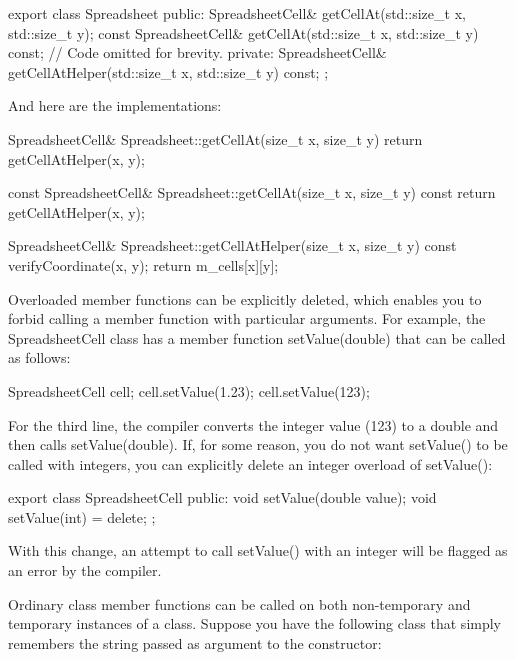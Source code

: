 \begin{cpp}
export class Spreadsheet
{
    public:
        SpreadsheetCell& getCellAt(std::size_t x, std::size_t y);
        const SpreadsheetCell& getCellAt(std::size_t x, std::size_t y) const;
        // Code omitted for brevity.
    private:
        SpreadsheetCell& getCellAtHelper(std::size_t x, std::size_t y) const;
};
\end{cpp}

And here are the implementations:

\begin{cpp}
SpreadsheetCell& Spreadsheet::getCellAt(size_t x, size_t y)
{
    return getCellAtHelper(x, y);
}

const SpreadsheetCell& Spreadsheet::getCellAt(size_t x, size_t y) const
{
    return getCellAtHelper(x, y);
}

SpreadsheetCell& Spreadsheet::getCellAtHelper(size_t x, size_t y) const
{
    verifyCoordinate(x, y);
    return m_cells[x][y];
}
\end{cpp}


Overloaded member functions can be explicitly deleted, which enables you to forbid calling a member function with particular arguments. For example, the SpreadsheetCell class has a member function setValue(double) that can be called as follows:

\begin{cpp}
SpreadsheetCell cell;
cell.setValue(1.23);
cell.setValue(123);
\end{cpp}

For the third line, the compiler converts the integer value (123) to a double and then calls setValue(double). If, for some reason, you do not want setValue() to be called with integers, you can explicitly delete an integer overload of setValue():

\begin{cpp}
export class SpreadsheetCell
{
    public:
        void setValue(double value);
        void setValue(int) = delete;
};
\end{cpp}

With this change, an attempt to call setValue() with an integer will be flagged as an error by the compiler.


Ordinary class member functions can be called on both non-temporary and temporary instances of a class. Suppose you have the following class that simply remembers the string passed as argument to the constructor:

